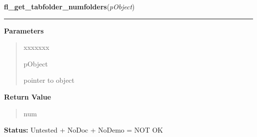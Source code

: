 \hspace{.8\funcindent}\begin{boxedminipage}{\funcwidth}

    \raggedright \textbf{fl\_get\_tabfolder\_numfolders}(\textit{pObject})

    \vspace{-1.5ex}

    \rule{\textwidth}{0.5\fboxrule}
\setlength{\parskip}{2ex}
\setlength{\parskip}{1ex}
      \textbf{Parameters}
      \vspace{-1ex}

      \begin{quote}
        \begin{Ventry}{xxxxxxx}

          \item[pObject]

          pointer to object

        \end{Ventry}

      \end{quote}

      \textbf{Return Value}
    \vspace{-1ex}

      \begin{quote}
      num

      \end{quote}

\textbf{Status:} Untested + NoDoc + NoDemo = NOT OK



    \end{boxedminipage}

    \label{xformslib:library:fl_get_active_folder}

    \vspace{0.5ex}

